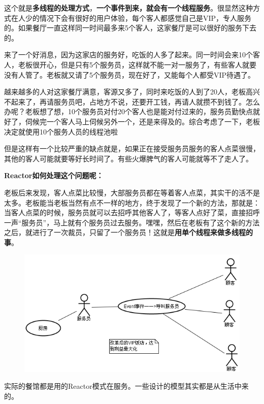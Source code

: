 \documentclass[UTF8,a4paper,12pt]{ctexbook}
\begin{document}
			这个就是\textbf{多线程的处理方式}，\textbf{一个事件到来，就会有一个线程服务}。很显然这种方式在人少的情况下会有很好的用户体验，每个客人都感觉自己是VIP，专人服务的。如果餐厅一直这样同一时间最多来5个客人，这家餐厅是可以很好的服务下去的。
			
			来了一个好消息，因为这家店的服务好，吃饭的人多了起来。同一时间会来10个客人，老板很开心，但是只有5个服务员，这样就不能一对一服务了，有些客人就要没有人管了。老板就又请了5个服务员，现在好了，又能每个人都受VIP待遇了。
			
			越来越多的人对这家餐厅满意，客源又多了，同时来吃饭的人到了20人，老板高兴不起来了，再请服务员吧，占地方不说，还要开工钱，再请人就攒不到钱了。怎么办呢？老板想了想，10个服务员对付20个客人也是能对付过来的，服务员勤快点就好了，伺候完一个客人马上伺候另外一个，还是来得及的。综合考虑了一下，老板决定就使用10个服务人员的线程池啦
			
			但是这样有一个比较严重的缺点就是，如果正在接受服务员服务的客人点菜很慢，其他的客人可能就要等好长时间了。有些火爆脾气的客人可能就等不了走人了。
			
			\textbf{Reactor如何处理这个问题呢：}
			
			老板后来发现，客人点菜比较慢，大部服务员都在等着客人点菜，其实干的活不是太多。老板能当老板当然有点不一样的地方，终于发现了一个新的方法，那就是：当客人点菜的时候，服务员就可以去招呼其他客人了，等客人点好了菜，直接招呼一声“服务员”，马上就有个服务员过去服务。嘿嘿，然后在老板有了这个新的方法之后，就进行了一次裁员，只留了一个服务员！这就是\textbf{用单个线程来做多线程的事}。
			
				\begin{figure}[h]
					\centering
					\includegraphics[scale = 0.8]{figures/ReactorExample.png}
				\end{figure}
			
			实际的餐馆都是用的Reactor模式在服务。一些设计的模型其实都是从生活中来的。
			
\end{document}
